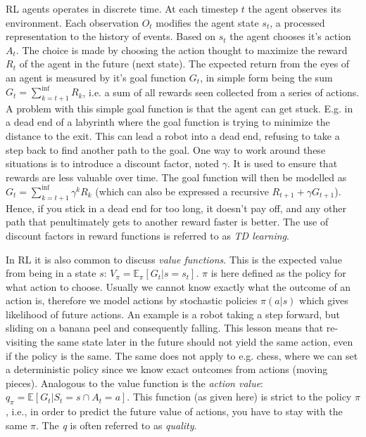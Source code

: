 \documentclass[10pt,twocolumn,letterpaper]{article}
\begin{document}
\gls{RL} agents operates in discrete time. At each timestep $t$ the agent observes its environment. Each observation $O_{t}$ modifies the agent state $s_{t}$, a processed representation to the history of events. Based on $s_{t}$ the agent chooses it's action $A_{t}$. The choice is made by choosing the action thought to maximize the reward $R_{t}$ of the agent in the future (next state). The expected return from the eyes of an agent is measured by it's goal function $G_{t}$, in simple form being the sum $G_{t} = \sum_{k=t+1}^{\inf{}}{R_{k}}$, i.e. a sum of all rewards seen collected from a series of actions. A problem with this simple goal function is that the agent can get stuck. E.g. in a dead end of a labyrinth where the goal function is trying to minimize the distance to the exit. This can lead a robot into a dead end, refusing to take a step back to find another path to the goal. One way to work around these situations is to introduce a discount factor, noted $\gamma{}$. It is used to ensure that rewards are less valuable over time. The goal function will then be modelled as $G_{t} = \sum_{k=t+1}^{\inf{}}\gamma^{k}{R_{k}}$ (which can also be expressed a recursive $R_{t+1} + \gamma{G_{t+1}}$). Hence, if you stick in a dead end for too long, it doesn't pay off, and any other path that penultimately gets to another reward faster is better. The use of discount factors in reward functions is referred to as \textit{\gls{TD} learning}.

In \gls{RL} it is also common to discuss \textit{value functions}. This is the expected value from being in a state $s$: $V_{\pi} = \mathbb{E}_{\pi} [ G_{t} | s = s_{t}]$. $\pi$ is here defined as the policy for what action to choose. Usually we cannot know exactly what the outcome of an action is, therefore we model actions by stochastic policies $\pi{}(a | s)$ which gives likelihood of future actions. An example is a robot taking a step forward, but sliding on a banana peel and consequently falling. This lesson means that re-visiting the same state later in the future should not yield the same action, even if the policy is the same. The same does not apply to e.g. chess, where we can set a deterministic policy since we know exact outcomes from actions (moving pieces). 
Analogous to the value function is the \textit{action value}: $q_{\pi{}} = \mathbb{E} [ G_{t} \vert{} S_{t} = s \cap A_{t} = a]$. This function (as given here) is strict to the policy $\pi$, i.e., in order to predict the future value of actions, you have to stay with the same $\pi$. The \textit{q} is often referred to as \textit{quality}. 
\end{document}
